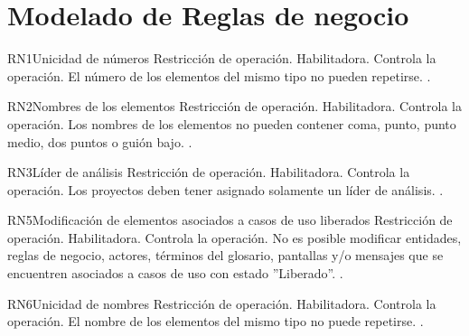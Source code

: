 \section{Modelado de Reglas de negocio}


\begin{BussinesRule}{RN1}{Unicidad de números}
	\BRitem[Tipo:] Restricción de operación. 
	\BRitem[Clase:] Habilitadora. 
	\BRitem[Nivel:] Controla la operación. %
	\BRitem[Descripción:] El número de los elementos del mismo tipo no pueden repetirse.
	 \UCref{}{}.
\end{BussinesRule}


\begin{BussinesRule}{RN2}{Nombres de los elementos}
	\BRitem[Tipo:] Restricción de operación. 
	\BRitem[Clase:] Habilitadora. 
	\BRitem[Nivel:] Controla la operación. %
	\BRitem[Descripción:] Los nombres de los elementos no pueden contener coma, punto, punto medio, dos puntos o guión bajo.
	 \UCref{}{}.
\end{BussinesRule}


\begin{BussinesRule}{RN3}{Líder de análisis}
	\BRitem[Tipo:] Restricción de operación. 
	\BRitem[Clase:] Habilitadora. 
	\BRitem[Nivel:] Controla la operación. %
	\BRitem[Descripción:] Los proyectos deben tener asignado solamente un líder de análisis.
	 \UCref{}{}.
\end{BussinesRule}


\begin{BussinesRule}{RN5}{Modificación de elementos asociados a casos de uso liberados}
	\BRitem[Tipo:] Restricción de operación. 
	\BRitem[Clase:] Habilitadora. 
	\BRitem[Nivel:] Controla la operación. %
	\BRitem[Descripción:] No es posible modificar entidades, reglas de negocio, actores, términos del glosario, pantallas y/o mensajes que se encuentren asociados a casos de uso con estado ''Liberado''.
	 \UCref{}{}.
\end{BussinesRule}



\begin{BussinesRule}{RN6}{Unicidad de nombres}
	\BRitem[Tipo:] Restricción de operación. 
	\BRitem[Clase:] Habilitadora. 
	\BRitem[Nivel:] Controla la operación. %
	\BRitem[Descripción:] El nombre de los elementos del mismo tipo no puede repetirse.
	 \UCref{}{}.
\end{BussinesRule}

